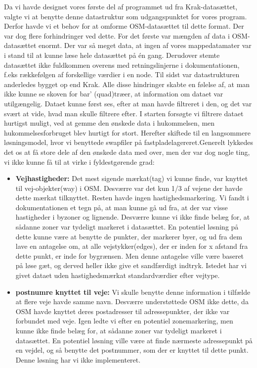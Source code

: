 Da vi havde designet vores første del af programmet ud fra Krak-datasættet, valgte vi at benytte denne datastruktur som udgangspunktet for vores program. Derfor havde vi et behov for at omforme OSM-datasættet til dette format. Der var dog flere forhindringer ved dette. For det første var mængden af data i OSM-datasættet enormt. Der var så meget data, at ingen af vores mappedatamater var i stand til at kunne læse hele datasættet på én gang. Derudover stemte datasættet ikke fuldkommen overens med retningslinjerne i dokumentationen, f.eks rækkefølgen af forskellige værdier i en node. Til sidst var datastrukturen anderledes bygget op end Krak. Alle disse hindringer skabte en følelse af, at man ikke kunne se skoven for bar' (quad)træer, at information om dataet var utilgængelig. Dataet kunne først ses, efter at man havde filtreret i den, og det var svært at vide, hvad man skulle filtrere efter. I starten forsøgte vi filtrere dataet hurtigst muligt, ved at gemme den ønskede data i hukommelsen, men hukommelsesforbruget blev hurtigt for stort. Herefter skiftede til en langsommere løsningsmodel, hvor vi benyttede swapfiler på fastpladelagereret.Generelt lykkedes det os at få store dele af den ønskede data med over, men der var dog nogle ting, vi ikke kunne få til at virke i fyldestgørende grad:

\begin{itemize}
	\item \textbf{Vejhastigheder:} Det mest sigende mærkat(tag) vi kunne finde, var knyttet til vej-objekter(way) i OSM. Desværre var det kun 1/3 af vejene der havde dette mærkat tilknyttet. Resten havde ingen hastighedsmarkering. Vi fandt i dokumentationen et tegn på, at man kunne gå ud fra, at der var visse hastigheder i byzoner og lignende. Desværre kunne vi ikke finde belæg for, at sådanne zoner var tydeligt markeret i datasættet. En potentiel løsning på dette kunne være at benytte de punkter, der markerer byer, og ud fra dem lave en antagelse om, at alle vejstykker(edges), der er inden for x afstand fra dette punkt, er inde for bygrænsen. Men denne antagelse ville være baseret på løse gæt, og derved heller ikke give et sandfærdigt indtryk. Istedet har vi givet dataet uden hastighedsmærkat standardværdier efter vejtype.
	\item \textbf{postnumre knyttet til veje:} Vi skulle benytte denne information i tilfælde at flere veje havde samme navn. Desværre understøttede OSM ikke dette, da OSM havde knyttet deres postadresser til adressepunkter, der ikke var forbundet med veje. Igen ledte vi efter en potentiel zonemarkering, men kunne ikke finde belæg for, at sådanne zoner var tydeligt markeret i datasættet. En potentiel løsning ville være at finde nærmeste adressepunkt på en vejdel, og så benytte det postnummer, som der er knyttet til dette punkt. Denne løsning har vi ikke implementeret.
\end{itemize}

